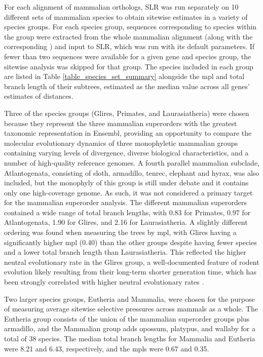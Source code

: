 For each alignment of mammalian orthologs, SLR was run separately on
10 different sets of mammalian species to obtain sitewise estimates in
a variety of species groups. For each species group, sequences
corresponding to species within the group were extracted from the
whole mammalian alignment (along with the corresponding \subtr) and
input to SLR, which was run with its default parameters. If fewer than
two sequences were available for a given gene and species group, the
sitewise analysis was skipped for that group. The species included in
each group are listed in Table \ref{table_species_set_summary}
alongside the \acf{mpl} and total branch length of their subtrees,
estimated as the median value across all \ntrees genes' estimates of
\ds distances.

Three of the species groups (Glires, Primates, and Laurasiatheria) were
chosen because they represent the three mammalian superorders with the
greatest taxonomic representation in Ensembl, providing an opportunity
to compare the molecular evolutionary dynamics of three monophyletic
mammalian groups containing varying levels of divergence, diverse
biological characteristics, and a number of high-quality reference
genomes. A fourth parallel mammalian subclade, Atlantogenata,
consisting of sloth, armadillo, tenrec, elephant and hyrax, was also
included, but the monophyly of this group is still under debate
\citep{Murphy2007,Churakov2009} and it contains only one high-coverage
genome. As such, it was not considered a primary target for the
mammalian superorder analysis. The different mammalian superorders
contained a wide range of total branch lengths, with 0.83 for
Primates, 0.97 for Atlantogenata, 1.90 for Glires, and 2.16 for
Laurasiatheria. A slightly different ordering was found when measuring
the trees by \ac{mpl}, with Glires having a significantly higher
\ac{mpl} (0.40) than the other groups despite having fewer species and
a lower total branch length than Laurasiatheria. This reflected the
higher neutral evolutionary rate in the Glires group, a
well-documented feature of rodent evolution likely resulting from
their long-term shorter generation time, which has been strongly
correlated with higher neutral evolutionary rates
\citep{Nikolaev2007,Smith2008}.

Two larger species groups, Eutheria and Mammalia, were chosen for the
purpose of measuring average sitewise selective pressures across
mammals as a whole. The Eutheria group consists of the union of the
mammalian superorder groups plus armadillo, and the Mammalian group
adds opossum, platypus, and wallaby for a total of 38 species. The
median total branch lengths for Mammalia and Eutheria were 8.21 and
6.43, respectively, and the \ac{mpl}s were 0.67 and 0.35.

